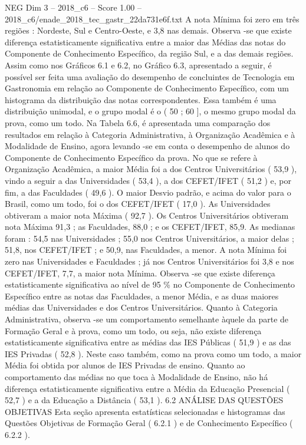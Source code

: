 \begin{textsample}{NEG Dim 3 – 2018\_c6 – Score 1.00 – 2018\_c6/enade\_2018\_tec\_gastr\_22da731e6f.txt}
A nota Mínima foi zero em três regiões : Nordeste, Sul e Centro-Oeste, e 3,8 nas demais.
Observa -se que existe diferença estatisticamente significativa entre a maior das Médias das notas do Componente de Conhecimento Específico, da região Sul, e a das demais regiões.
Assim como nos Gráficos 6.1 e 6.2, no Gráfico 6.3, apresentado a seguir, é possível ser feita uma avaliação do desempenho de concluintes de Tecnologia em Gastronomia em relação ao Componente de Conhecimento Específico, com um histograma da distribuição das notas correspondentes.
Essa também é uma distribuição unimodal, e o grupo modal é o ( 50 ; 60 ], o mesmo grupo modal da prova, como um todo.
Na Tabela 6.6, é apresentada uma comparação dos resultados em relação à Categoria Administrativa, à Organização Acadêmica e à Modalidade de Ensino, agora levando -se em conta o desempenho de alunos do Componente de Conhecimento Específico da prova.
No que se refere à Organização Acadêmica, a maior Média foi a dos Centros Universitários ( 53,9 ), vindo a seguir a das Universidades ( 53,4 ), a dos CEFET/IFET ( 51,2 ) e, por fim, a das Faculdades ( 49,6 ).
O maior Desvio padrão, e acima do valor para o Brasil, como um todo, foi o dos CEFET/IFET ( 17,0 ).
As Universidades obtiveram a maior nota Máxima ( 92,7 ).
Os Centros Universitários obtiveram nota Máxima 91,3 ; as Faculdades, 88,0 ; e os CEFET/IFET, 85,9.
As medianas foram : 54,5 nas Universidades ; 55,0 nos Centros Universitários, a maior delas ; 51,8, nos CEFET/IFET ; e 50,9, nas Faculdades, a menor.
A nota Mínima foi zero nas Universidades e Faculdades ; já nos Centros Universitários foi 3,8 e nos CEFET/IFET, 7,7, a maior nota Mínima.
Observa -se que existe diferença estatisticamente significativa ao nível de 95 \% no Componente de Conhecimento Específico entre as notas das Faculdades, a menor Média, e as duas maiores médias das Universidades e dos Centros Universitários.
Quanto à Categoria Administrativa, observa -se um comportamento semelhante àquele da parte de Formação Geral e à prova, como um todo, ou seja, não existe diferença estatisticamente significativa entre as médias das IES Públicas ( 51,9 ) e as das IES Privadas ( 52,8 ).
Neste caso também, como na prova como um todo, a maior Média foi obtida por alunos de IES Privadas de ensino.
Quanto ao comportamento das médias no que toca à Modalidade de Ensino, não há diferença estatisticamente significativa entre a Média da Educação Presencial ( 52,7 ) e a da Educação a Distância ( 53,1 ). 6.2 ANÁLISE DAS QUESTÕES OBJETIVAS Esta seção apresenta estatísticas selecionadas e histogramas das Questões Objetivas de Formação Geral ( 6.2.1 ) e de Conhecimento Específico ( 6.2.2 ).

\end{textsample}
